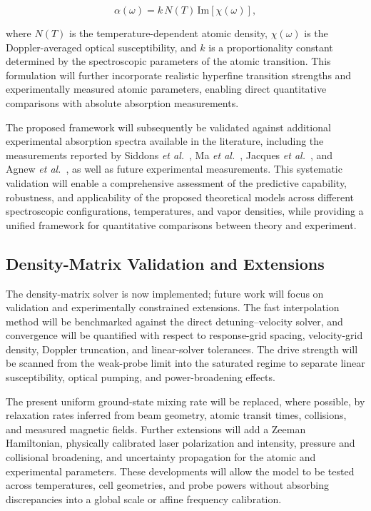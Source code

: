 \documentclass[11pt]{article}
\numberwithin{equation}{section}
\begin{document}
\begin{equation}
\label{eq:absorption_coefficient}
\alpha(\omega)
=
k\,N(T)\,
\mathrm{Im}\!\left[\chi(\omega)\right],
\end{equation}

where $N(T)$ is the temperature-dependent atomic density, $\chi(\omega)$ is the Doppler-averaged optical susceptibility, and $k$ is a proportionality constant determined by the spectroscopic parameters of the atomic transition. This formulation will further incorporate realistic hyperfine transition strengths and experimentally measured atomic parameters, enabling direct quantitative comparisons with absolute absorption measurements.

The proposed framework will subsequently be validated against additional experimental absorption spectra available in the literature, including the measurements reported by Siddons \textit{et al.}~\cite{Siddons2008}, Ma \textit{et al.}~\cite{Ma2017}, Jacques \textit{et al.}~\cite{Jacques2009}, and Agnew \textit{et al.}~\cite{Agnew2024}, as well as future experimental measurements. This systematic validation will enable a comprehensive assessment of the predictive capability, robustness, and applicability of the proposed theoretical models across different spectroscopic configurations, temperatures, and vapor densities, while providing a unified framework for quantitative comparisons between theory and experiment.

\subsection{Density-Matrix Validation and Extensions}

The density-matrix solver is now implemented; future work will focus on validation and experimentally constrained extensions. The fast interpolation method will be benchmarked against the direct detuning--velocity solver, and convergence will be quantified with respect to response-grid spacing, velocity-grid density, Doppler truncation, and linear-solver tolerances. The drive strength will be scanned from the weak-probe limit into the saturated regime to separate linear susceptibility, optical pumping, and power-broadening effects.

The present uniform ground-state mixing rate will be replaced, where possible, by relaxation rates inferred from beam geometry, atomic transit times, collisions, and measured magnetic fields. Further extensions will add a Zeeman Hamiltonian, physically calibrated laser polarization and intensity, pressure and collisional broadening, and uncertainty propagation for the atomic and experimental parameters. These developments will allow the model to be tested across temperatures, cell geometries, and probe powers without absorbing discrepancies into a global scale or affine frequency calibration.
\end{document}
